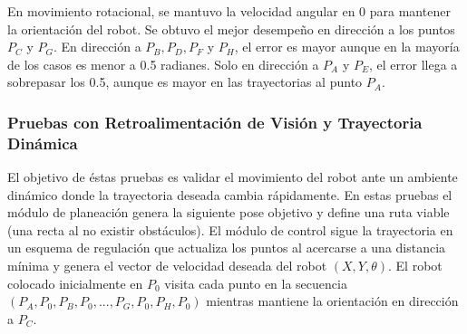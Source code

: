 \documentclass[twocolumn,10pt]{amrob}
\begin{document}

En movimiento rotacional, se mantuvo la velocidad angular en 0 para mantener la orientación del robot. Se obtuvo el mejor desempeño en dirección a los puntos $P_C$ y $P_G$. En dirección a $P_B, P_D, P_F$ y $P_H$, el error es mayor aunque en la mayoría de los casos es menor a 0.5 radianes. Solo en dirección a $P_A$ y $P_E$, el error llega a sobrepasar los 0.5, aunque es mayor en las trayectorias al punto $P_A$. 

\subsubsection*{Pruebas con Retroalimentación de Visión y Trayectoria Dinámica}
\label{subsec:exp_res-pruebas_vision}
El objetivo de éstas pruebas es validar el movimiento del robot ante un ambiente dinámico donde la trayectoria deseada cambia rápidamente. En estas pruebas el módulo de planeación genera la siguiente pose objetivo y define una ruta viable (una recta al no existir obstáculos). El módulo de control sigue la trayectoria en un esquema de regulación que actualiza los puntos al acercarse a una distancia mínima y genera el vector de velocidad deseada del robot $(X, Y, \theta)$. El robot colocado inicialmente en $P_0$ visita cada punto en la secuencia $(P_A, P_0, P_B, P_0, ..., P_G, P_0, P_H, P_0)$ mientras mantiene la orientación en dirección a $P_C$. 
\end{document}
